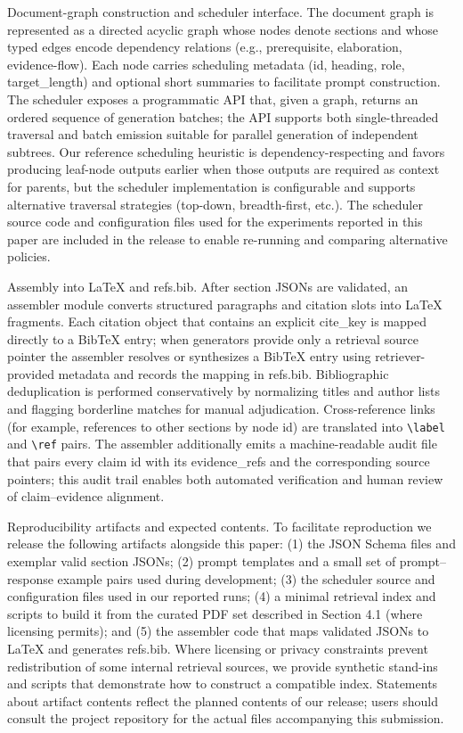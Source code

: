 Document-graph construction and scheduler interface.
The document graph is represented as a directed acyclic graph whose nodes denote sections and whose typed edges encode dependency relations (e.g., prerequisite, elaboration, evidence-flow). Each node carries scheduling metadata (id, heading, role, target_length) and optional short summaries to facilitate prompt construction. The scheduler exposes a programmatic API that, given a graph, returns an ordered sequence of generation batches; the API supports both single-threaded traversal and batch emission suitable for parallel generation of independent subtrees. Our reference scheduling heuristic is dependency-respecting and favors producing leaf-node outputs earlier when those outputs are required as context for parents, but the scheduler implementation is configurable and supports alternative traversal strategies (top-down, breadth-first, etc.). The scheduler source code and configuration files used for the experiments reported in this paper are included in the release to enable re-running and comparing alternative policies.

Assembly into LaTeX and refs.bib.
After section JSONs are validated, an assembler module converts structured paragraphs and citation slots into LaTeX fragments. Each citation object that contains an explicit cite_key is mapped directly to a BibTeX entry; when generators provide only a retrieval source pointer the assembler resolves or synthesizes a BibTeX entry using retriever-provided metadata and records the mapping in refs.bib. Bibliographic deduplication is performed conservatively by normalizing titles and author lists and flagging borderline matches for manual adjudication. Cross-reference links (for example, references to other sections by node id) are translated into \verb|\label| and \verb|\ref| pairs. The assembler additionally emits a machine-readable audit file that pairs every claim id with its evidence_refs and the corresponding source pointers; this audit trail enables both automated verification and human review of claim–evidence alignment.

Reproducibility artifacts and expected contents.
To facilitate reproduction we release the following artifacts alongside this paper: (1) the JSON Schema files and exemplar valid section JSONs; (2) prompt templates and a small set of prompt–response example pairs used during development; (3) the scheduler source and configuration files used in our reported runs; (4) a minimal retrieval index and scripts to build it from the curated PDF set described in Section 4.1 (where licensing permits); and (5) the assembler code that maps validated JSONs to LaTeX and generates refs.bib. Where licensing or privacy constraints prevent redistribution of some internal retrieval sources, we provide synthetic stand-ins and scripts that demonstrate how to construct a compatible index. Statements about artifact contents reflect the planned contents of our release; users should consult the project repository for the actual files accompanying this submission.

